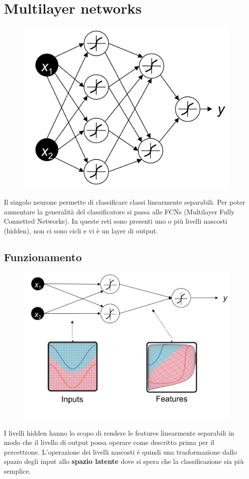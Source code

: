 \section{Multilayer networks}
\begin{figure}
	\vspace{-.8cm}
	\centering
	\includegraphics[width=.9\linewidth]{Picture/FCNs}
\end{figure}
Il singolo neurone permette di classificare classi linearmente separabili. Per poter aumentare la generalità del classificatore si passa alle FCNs (Multilayer Fully Connetted Networks). In queste reti sono presenti uno o più livelli nascosti (hidden), non ci sono cicli e vi è un layer di output.
\newpage
\subsection{Funzionamento}
\begin{figure}
	\vspace{-.1cm}
	\centering
	\includegraphics[width=.95\linewidth]{Picture/FCNs_Mapping}
\end{figure}
I livelli hidden hanno lo scopo di rendere le features linearmente separabili in modo che il livello di output possa operare come descritto prima per il percettrone. L'operazione dei livelli nascosti è quindi una trasformazione dallo spazio degli input allo \textbf{spazio latente} dove si spera che la classificazione sia più semplice. 

